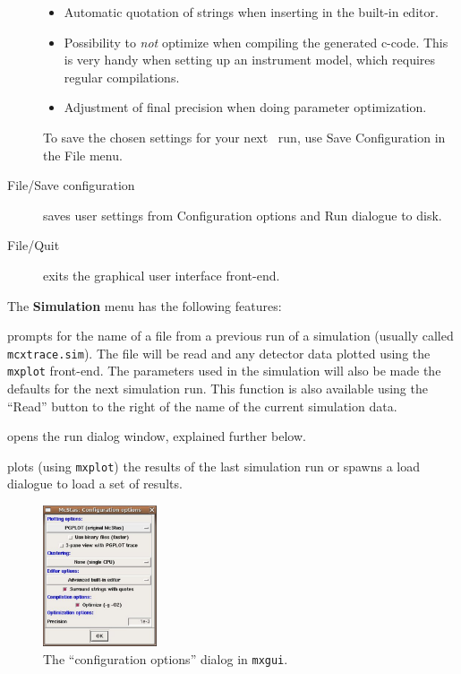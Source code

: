 \begin{description}
\begin{itemize}
  \item Automatic quotation of strings when inserting in the built-in
    editor.
  \item Possibility to \emph{not} optimize when compiling the
    generated c-code. This is very handy when setting up an instrument model, which requires regular compilations.
  \item Adjustment of final precision when doing parameter optimization.
\end{itemize}
To save the chosen settings for your next \MCX\ run, use Save
Configuration in the File menu.
\item[File/Save configuration] saves user settings from Configuration
  options and Run dialogue to disk.
\item[File/Quit] exits the graphical user interface front-end.
\end{description}

\noindent The {\bf Simulation} menu has the following features:
\begin{description} 
\item[Simulation/Read old simulation] prompts for the name of a file
  from a previous run of a \MCX  simulation (usually called
  \verb+mcxtrace.sim+). The file will be read and any detector data
  plotted using the \verb+mxplot+ front-end. The parameters used in the
  simulation will also be made the defaults for the next simulation
  run. This function is also available using the ``Read'' button to the
  right of the name of the current simulation data.
\item[Simulation/Run simulation] opens the run dialog window, explained
  further below.
\item[Simulation/Plot results] plots (using \verb+mxplot+) the results of the
  last simulation run or spawns a load dialogue to load a set of results.
\end{description}


\begin{figure}[htb!]
  \begin{center}
    \includegraphics[width=0.3\textwidth]{figures/choose_backend.eps}
  \end{center}
\caption{The ``configuration options'' dialog in \texttt{mxgui}.} 
\label{fig:mxgui-choose}
\end{figure}


